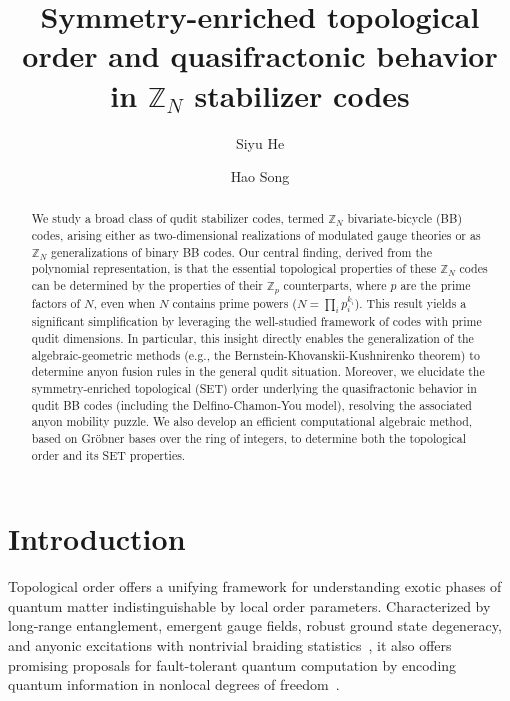 \documentclass[aps,prb,english,superscriptaddress,twocolumn,tightenlines,showpacs,longbibliography,floatfix,amsfonts]{revtex4-2}
\begin{document}
\title{Symmetry-enriched topological order and quasifractonic behavior in $\mathbb{Z}_N$ stabilizer codes}
\author{Siyu He}
\author{Hao Song}


\begin{abstract}
We study a broad class of qudit stabilizer codes, termed $\mathbb{Z}_N$ bivariate-bicycle (BB) codes, arising either as two-dimensional realizations of modulated gauge theories or as $\mathbb{Z}_N$ generalizations of binary BB codes. Our central finding, derived from the polynomial representation, is that the essential topological properties of these $\mathbb{Z}_N$ codes can be determined by the properties of their $\mathbb{Z}_p$ counterparts, where $p$ are the prime factors of $N$, even when $N$ contains prime powers ($N = \prod_i p_i^{k_i}$). This result yields a significant simplification by leveraging the well-studied framework of codes with prime qudit dimensions. In particular, this insight directly enables the generalization of the algebraic-geometric methods (e.g., the Bernstein-Khovanskii-Kushnirenko theorem) to determine anyon fusion rules in the general qudit situation. Moreover, we elucidate the symmetry-enriched topological (SET) order underlying the quasifractonic behavior in qudit BB codes (including the Delfino-Chamon-You model), resolving the associated anyon mobility puzzle. We also develop an efficient computational algebraic method, based on Gr\"{o}bner bases over the ring of integers, to determine both the topological order and its SET properties.
\end{abstract}

\maketitle

\section{Introduction}

Topological order offers a unifying framework for understanding exotic phases of quantum matter indistinguishable by local order parameters. Characterized by long-range entanglement, emergent gauge fields, robust ground state degeneracy, and anyonic excitations with nontrivial braiding statistics~\cite{Wen1990, Wen1990_2, Kitaev2003, Kitaev2006, Levin2006, Kitaev2006_2, Wen2017}, it also offers promising proposals for fault-tolerant quantum computation by encoding quantum information in nonlocal degrees of freedom~\cite{Dennis2002, Nayak2008}.
  
\end{document}
